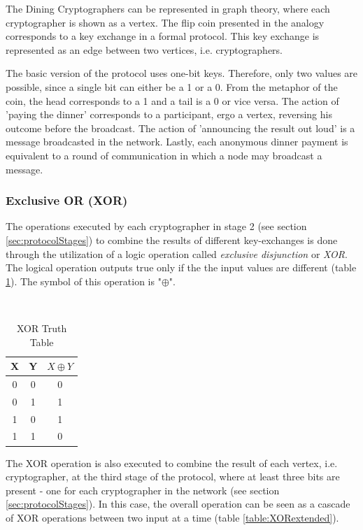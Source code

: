 The Dining Cryptographers can be represented in graph theory, where each cryptographer is shown as a vertex. The flip coin presented in the analogy corresponds to a key exchange in a formal protocol. This key exchange is represented as an edge between two vertices, i.e. cryptographers. 

The basic version of the protocol uses one-bit keys. Therefore, only two values are possible, since a single bit can either be a 1 or a 0. From the metaphor of the coin, the head corresponds to a 1 and a tail is a 0 or vice versa.
The action of 'paying the dinner' corresponds to a participant, ergo a vertex, reversing his outcome before the broadcast. The action of 'announcing the result out loud' is a message broadcasted in the network. Lastly, each anonymous dinner payment is equivalent to a round of communication in which a node may broadcast a message.

\subsubsection{Exclusive OR (XOR)}
The operations executed by each cryptographer in stage 2 (see section \ref{sec:protocolStages}) to combine the results of different key-exchanges is done through the utilization of a logic operation called \textit{exclusive disjunction} or \textit{XOR}. The logical operation outputs true only if the the input values are different (table \ref{table:XOR}). The symbol of this operation is "$\oplus$".

\begin{table}[h!]
\centering
\caption{XOR Truth Table}
~\\[0.5ex]
\begin{tabular}{|| c | c | c ||} 
 \hline
 X & Y &  $X \oplus Y$ \\ [0.ex] 
 \hline\hline
 0 & 0 & 0 \\ 
 0 & 1 & 1 \\
 1 & 0 & 1 \\
 1 & 1 & 0 \\ [1ex]
 \hline
\end{tabular}
\label{table:XOR}
\end{table}

The XOR operation is also executed to combine the result of each vertex, i.e. cryptographer, at the third stage of the protocol, where at least three bits are present - one for each cryptographer in the network (see section \ref{sec:protocolStages}). In this case, the overall operation can be seen as a cascade of XOR operations between two input at a time (table \ref{table:XORextended}).



